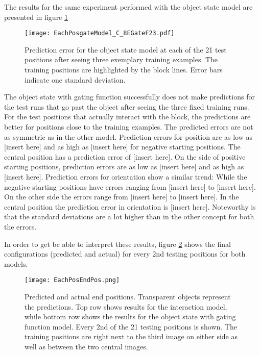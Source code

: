 The results for the same experiment performed with the object state model are presented in figure \ref{fig:eachPosGate}

\begin{figure}
\centering
\texttt{[image: EachPosgateModel\_C\_8EGateF23.pdf]}
\caption{Prediction error for the object state model at each of the 21 test positions after seeing three exemplary training examples. The training positions are highlighted by the block lines. Error bars indicate one standard deviation.}
\label{fig:eachPosGate}
\end{figure}

The object state with gating function successfully does not make predictions for the test runs that go past the object after seeing the three fixed training runs. For the test positions that actually interact with the block, the predictions are better for positions close to the training examples.
The predicted errors are not as symmetric as in the other model. %
Prediction errors for position are as low as [insert here] and as high as [insert here] for negative starting positions. The central position has a prediction error of [insert here]. On the side of positive starting positions, prediction errors are as low as [insert here] and as high as [insert here].
Prediction errors for orientation show a similar trend: While the negative starting positions have errors ranging from [insert here] to [insert here]. On the other side the errors range from [insert here] to [insert here]. 
In the central position the prediction error in orientation is [insert here].
Noteworthy is that the standard deviations are a lot higher than in the other concept for both the errors.

In order to get be able to interpret these results, figure \ref{fig:pushTaskEndPos} shows the final configurations (predicted and actual) for every 2nd testing positions for both models.

\begin{figure}
\centering
\texttt{[image: EachPosEndPos.png]}
\caption{Predicted and actual end positions. Transparent objects represent the predictions. Top row shows results for the interaction model, while bottom row shows the results for the object state with gating function model. Every 2nd of the 21 testing positions is shown. The training positions are right next to the third image on either side as well as between the two central images.}
\label{fig:pushTaskEndPos}
\end{figure}

